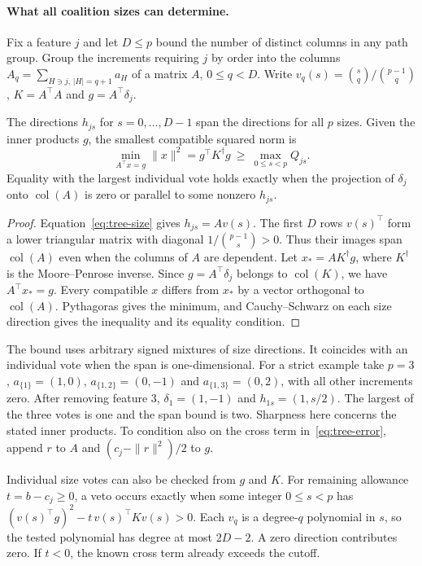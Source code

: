 \paragraph{What all coalition sizes can determine.}
Fix a feature $j$ and let $D\le p$ bound the number of distinct columns in
any path group. Group the increments requiring $j$ by order into the columns
$A_q=\sum_{H\ni j,\,|H|=q+1}a_H$ of a matrix $A$, $0\le q<D$. Write
$v_q(s)=\binom{s}{q}/\binom{p-1}{q}$, $K=A^\top A$ and $g=A^\top\delta_j$.

\begin{proposition}
The directions $h_{js}$ for $s=0,\ldots,D-1$ span the directions for all $p$
sizes. Given the inner products $g$, the smallest compatible squared norm is
\[
 \min_{A^\top x=g}\|x\|^2
   =g^\top K^\dagger g
   \ \ge\ \max_{0\le s<p}Q_{js}.
\]
Equality with the largest individual vote holds exactly when the projection of
$\delta_j$ onto $\operatorname{col}(A)$ is zero or parallel to some nonzero $h_{js}$.
\end{proposition}
\begin{proof}
Equation~\eqref{eq:tree-size} gives $h_{js}=Av(s)$. The first $D$ rows
$v(s)^\top$ form a lower triangular matrix with diagonal
$1/\binom{p-1}{s}>0$. Thus their images span $\operatorname{col}(A)$ even
when the columns of $A$ are dependent. Let $x_*=AK^\dagger g$, where
$K^\dagger$ is the Moore--Penrose inverse. Since $g=A^\top\delta_j$ belongs to
$\operatorname{col}(K)$, we have $A^\top x_*=g$.
Every compatible $x$ differs from $x_*$ by a vector orthogonal to
$\operatorname{col}(A)$. Pythagoras gives the minimum, and Cauchy--Schwarz
on each size direction gives the inequality and its equality condition.
\end{proof}

The bound uses arbitrary signed mixtures of size directions. It coincides with
an individual vote when the span is one-dimensional. For a strict example
take $p=3$, $a_{\{1\}}=(1,0)$, $a_{\{1,2\}}=(0,-1)$ and
$a_{\{1,3\}}=(0,2)$, with all other increments zero. After removing feature 3,
$\delta_1=(1,-1)$ and $h_{1s}=(1,s/2)$. The largest of the three votes is one
and the span bound is two. Sharpness here concerns the stated inner products.
To condition also on the cross term in~\eqref{eq:tree-error}, append $r$ to
$A$ and $(c_j-\|r\|^2)/2$ to $g$.

Individual size votes can also be checked from $g$ and $K$. For remaining
allowance $t=b-c_j\ge0$, a veto occurs exactly when some integer $0\le s<p$ has
$(v(s)^\top g)^2-t\,v(s)^\top Kv(s)>0$. Each $v_q$ is a degree-$q$
polynomial in $s$, so the tested polynomial has degree at most $2D-2$.
A zero direction contributes zero. If $t<0$, the known cross term already
exceeds the cutoff.

